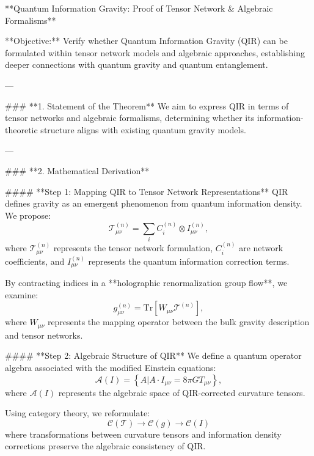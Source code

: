 **Quantum Information Gravity: Proof of Tensor Network & Algebraic Formalisms**

**Objective:** Verify whether Quantum Information Gravity (QIR) can be formulated within tensor network models and algebraic approaches, establishing deeper connections with quantum gravity and quantum entanglement.

---

### **1. Statement of the Theorem**
We aim to express QIR in terms of tensor networks and algebraic formalisms, determining whether its information-theoretic structure aligns with existing quantum gravity models.

---

### **2. Mathematical Derivation**

#### **Step 1: Mapping QIR to Tensor Network Representations**
QIR defines gravity as an emergent phenomenon from quantum information density. We propose:
\begin{equation}
    \mathcal{T}^{(n)}_{\mu \nu} = \sum_{i} C^{(n)}_{i} \otimes I^{(n)}_{\mu \nu},
\end{equation}
where \( \mathcal{T}^{(n)}_{\mu \nu} \) represents the tensor network formulation, \( C^{(n)}_{i} \) are network coefficients, and \( I^{(n)}_{\mu \nu} \) represents the quantum information correction terms.

By contracting indices in a **holographic renormalization group flow**, we examine:
\begin{equation}
    g^{(n)}_{\mu \nu} = \text{Tr} \left[ W_{\mu \nu} \mathcal{T}^{(n)} \right],
\end{equation}
where \( W_{\mu \nu} \) represents the mapping operator between the bulk gravity description and tensor networks.

#### **Step 2: Algebraic Structure of QIR**
We define a quantum operator algebra associated with the modified Einstein equations:
\begin{equation}
    \mathcal{A}(I) = \left\{ A | A \cdot I_{\mu \nu} = 8 \pi G T_{\mu \nu} \right\},
\end{equation}
where \( \mathcal{A}(I) \) represents the algebraic space of QIR-corrected curvature tensors.

Using category theory, we reformulate:
\begin{equation}
    \mathcal{C} ( \mathcal{T} ) \to \mathcal{C} ( g ) \to \mathcal{C} ( I )
\end{equation}
where transformations between curvature tensors and information density corrections preserve the algebraic consistency of QIR.


